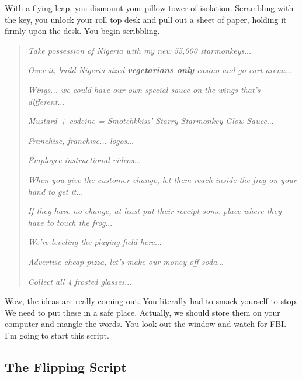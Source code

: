 \documentclass[10pt,twoside]{report}
\begin{document}
With a flying leap, you dismount your pillow tower of isolation.
Scrambling with the key, you unlock your roll top desk and pull out a
sheet of paper, holding it firmly upon the desk.  You begin
scribbling.

\begin{quote}


 {\em Take possession of Nigeria with my new 55,000 starmonkeys}...

 

 {\em Over it, build Nigeria-sized {\bf vegetarians only} casino and
   go-cart arena}...

 

 {\em Wings... we could have our own special sauce on the wings that's
   different}...

 

 {\em Mustard + codeine = Smotchkkiss' Starry Starmonkey Glow
   Sauce}...

 

 {\em Franchise, franchise... logos}...

 

 {\em Employee instructional videos}...

 

 {\em When you give the customer change, let them reach inside the
   frog on your hand to get it}...

 

 {\em If they have no change, at least put their receipt some place
   where they have to touch the frog}...

 

 {\em We're leveling the playing field here}...

 

 {\em Advertise cheap pizza, let's make our money off soda}...

 

 {\em Collect all 4 frosted glasses}...

\end{quote}


Wow, the ideas are really coming out.  You literally had to smack
yourself to stop.  We need to put these in a safe place.  Actually, we
should store them on your computer and mangle the words.  You look out
the window and watch for FBI.  I'm going to start this script.



\subsection{The Flipping Script}
\end{document}
